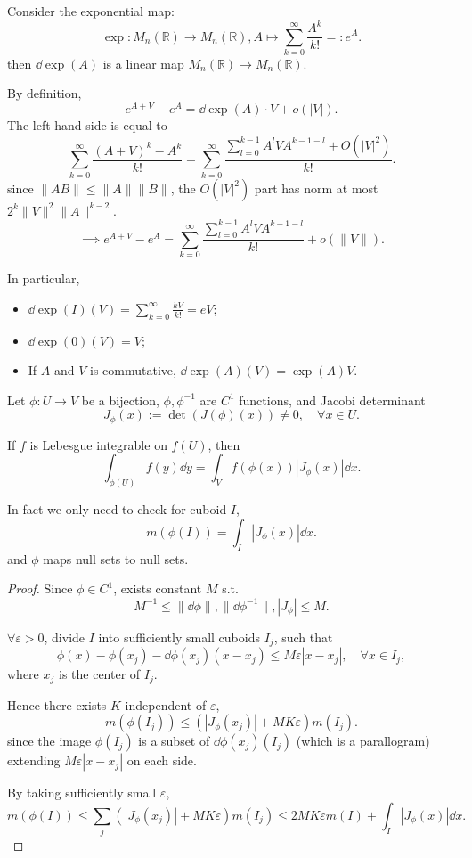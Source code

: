 \begin{example}
    Consider the exponential map:
	\[
	\exp: M_n(\mathbb{R}) \to M_n(\mathbb{R}),
	A \mapsto \sum_{k=0}^{\infty} \frac{A^k}{k!} =: e^A.
	\]
	then $\dd \exp (A)$ is a linear map $M_n(\mathbb{R})\to M_n(\mathbb{R})$.

	By definition,
	\[
	e^{A+V} - e^A = \dd \exp(A)\cdot V + o(|V|).
	\]
	The left hand side is equal to
	\[
	\sum_{k=0}^{\infty}\frac{(A+V)^k - A^k}{k!}
	= \sum_{k=0}^{\infty} \frac{\sum_{l=0}^{k-1} A^lVA^{k-1-l}+O(|V|^2)}{k!}.
	\]
	since $\lVert AB \rVert \le \lVert A \rVert \lVert B \rVert$,
	the $O(|V|^2)$ part has norm
	at most $2^k \lVert V \rVert ^2\lVert A \rVert ^{k-2}$.
	\[
	\implies e^{A+V} - e^A =
	\sum_{k=0}^{\infty} \frac{\sum_{l=0}^{k-1} A^lVA^{k-1-l}}{k!}
	+ o(\lVert V \rVert).
	\]

	In particular,
	\begin{itemize}
		\item $\dd \exp(I)(V) = \sum_{k=0}^{\infty} \frac{kV}{k!} = eV$;
		\item $\dd \exp (0)(V) = V$;
		\item If  $A$ and $V$ is commutative,
			$\dd\exp(A)(V) = \exp(A)V$.
	\end{itemize}
\end{example}

\begin{theorem}
    Let $\phi: U\to V$ be a bijection, $\phi,\phi^{-1}$ are $C^1$ functions,
	and Jacobi determinant
	\[
		J_\phi(x) := \det(J(\phi)(x))\ne 0, \quad\forall x\in U.
	\]

	If $f$ is Lebesgue integrable on $f(U)$, then
	\[
	\int_{\phi(U)} f(y)\dd y = \int_V f(\phi(x)) |J_\phi(x)|\dd x.
	\]
\end{theorem}
\begin{remark}
    In fact we only need to check for cuboid $I$,
	\[
	m(\phi(I)) = \int_I |J_\phi(x)|\dd x.
	\]
	and $\phi$ maps null sets to null sets.
\end{remark}
\begin{proof}[Proof]
    Since $\phi\in C^1$, exists constant $M$ s.t.
	\[
	M^{-1}\le \lVert \dd \phi \rVert, \lVert \dd \phi^{-1} \rVert,
	|J_\phi|\le M.
	\]

	$\forall \varepsilon>0$, divide $I$ into sufficiently small cuboids $I_j$,
	such that
	\[
	\phi(x) - \phi(x_j) - \dd \phi(x_j)(x - x_j)\le M\varepsilon |x-x_j|,
	\quad \forall x\in I_j,
	\]
	where $x_j$ is the center of $I_j$. 

	Hence there exists $K$ independent of $\varepsilon$,
	\[
	m(\phi(I_j))\le (|J_\phi(x_j)| + MK\varepsilon) m(I_j).
	\]
	since the image $\phi(I_j)$ is a subset of $\dd \phi(x_j)(I_j)$
	(which is a parallogram) extending $M\varepsilon |x-x_j|$ on each side.

	By taking sufficiently small $\varepsilon$,
	\[
	m(\phi(I))\le \sum_{j} (|J_\phi(x_j)| + MK\varepsilon) m(I_j)
	\le 2MK\varepsilon m(I) + \int_I |J_\phi(x)|\dd x.
	\]
	
\end{proof}
